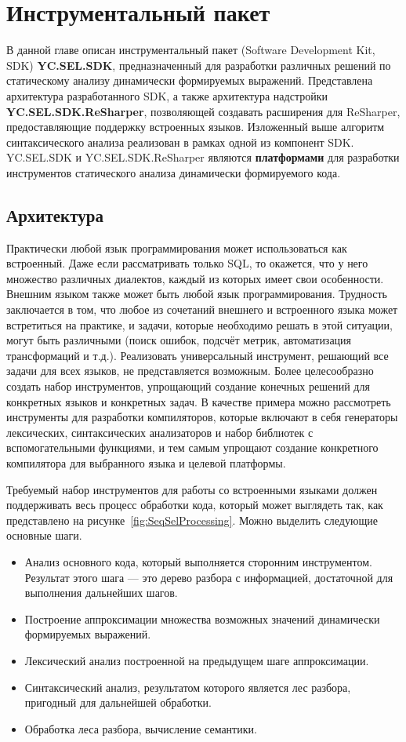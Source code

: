 \chapter{Инструментальный пакет} \label{relWorks}

В данной главе описан инструментальный пакет (Software Development Kit, SDK) \textbf{YC.SEL.SDK}, предназначенный для разработки различных решений по статическому анализу динамически формируемых выражений. Представлена архитектура разработанного SDK, а также архитектура надстройки \textbf{YC.SEL.SDK.ReSharper}, позволяющей создавать расширения для ReSharper, предоставляющие поддержку встроенных языков. Изложенный выше алгоритм синтаксического анализа реализован в рамках одной из компонент SDK. YC.SEL.SDK и YC.SEL.SDK.ReSharper являются \textbf{платформами} для разработки инструментов статического анализа динамически формируемого кода.

\section{Архитектура}

Практически любой язык программирования может использоваться как встроенный. Даже если рассматривать только SQL, то окажется, что у него множество различных диалектов, каждый из которых имеет свои особенности. Внешним языком также может быть любой язык программирования. Трудность заключается в том, что  любое из сочетаний внешнего и встроенного языка может встретиться на практике, и задачи, которые необходимо решать в этой ситуации, могут быть различными (поиск ошибок, подсчёт метрик, автоматизация трансформаций и т.д.). Реализовать универсальный инструмент, решающий все задачи для всех языков, не представляется возможным. Более целесообразно создать набор инструментов, упрощающий создание конечных решений для конкретных языков и конкретных задач. В качестве примера можно рассмотреть инструменты для разработки компиляторов, которые включают в себя генераторы лексических, синтаксических анализаторов и набор библиотек с вспомогательными функциями, и тем самым упрощают создание конкретного компилятора для выбранного языка и целевой платформы.

Требуемый набор инструментов для работы со встроенными языками должен поддерживать весь процесс обработки кода, который может выглядеть так, как представлено на рисунке~\ref{fig:SeqSelProcessing}. Можно выделить следующие основные шаги.
\begin{itemize}
    \item Анализ основного кода, который выполняется сторонним инструментом. Результат этого шага --- это дерево разбора с информацией, достаточной для выполнения дальнейших шагов.
    \item Построение аппроксимации множества возможных значений динамически формируемых выражений.
    \item Лексический анализ построенной на предыдущем шаге аппроксимации.
    \item Синтаксический анализ, результатом которого является лес разбора, пригодный для дальнейшей обработки.
    \item Обработка леса разбора, вычисление семантики.
\end{itemize}

